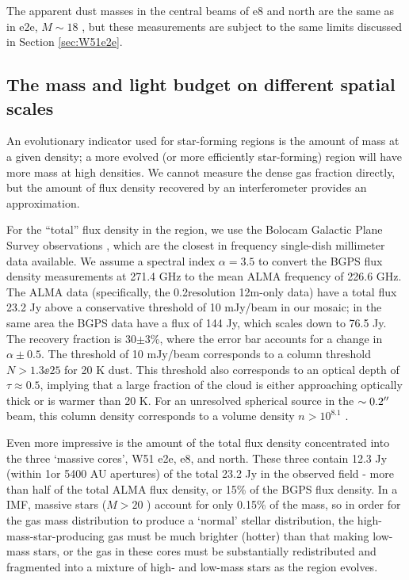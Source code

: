 \documentclass{aa}
\begin{document}
The apparent dust masses in the central beams of e8 and north are the same
as in e2e, $M\sim18$ \msun, but these measurements are subject to the same
limits discussed in Section \ref{sec:W51e2e}.

\subsection{The mass and light budget on different spatial scales}
\label{sec:massbudget}
An evolutionary indicator used for star-forming regions is the amount of mass
at a given density; a more evolved (or more efficiently star-forming) region will
have more mass at high densities.  We cannot measure the dense gas fraction
directly, but the amount of flux density recovered by an interferometer
provides an approximation.

For the ``total'' flux density in the region, we use the Bolocam Galactic Plane
Survey observations \citep{Aguirre2011a,Ginsburg2013a}, which are the closest
in frequency single-dish millimeter data available.  We assume a spectral index
$\alpha=3.5$ to convert the BGPS flux density measurements at 271.4 GHz to the
mean ALMA frequency of 226.6 GHz.  The ALMA data (specifically, the
0.2\arcsec resolution 12m-only data) have a total flux 23.2 Jy above a  conservative
threshold of 10 mJy/beam in our
mosaic; in the same area the BGPS data have a flux of 144 Jy, which scales down to
76.5 Jy.  The recovery fraction is 30$\pm3$\%, where the error bar accounts
for a change in $\alpha\pm0.5$.  The threshold of 10 mJy/beam corresponds to a
column threshold $N>1.3\ee{25}$ \percc for 20 K dust. This threshold also
corresponds to an optical depth of $\tau\approx0.5$, implying that a large
fraction of the cloud is either approaching optically thick or is warmer than 20
K.  For an unresolved spherical source in the $\sim0.2\mbox{$^{\prime\prime}$}$ beam, this
column density corresponds to a volume density $n>10^{8.1}$ \percc.


Even more impressive is the amount of the total flux density concentrated
into the three `massive cores', W51 e2e, e8, and north.  These three contain
12.3 Jy (within 1\arcsec or 5400 AU apertures) of the total 23.2 Jy in the
observed field - more than half of the total ALMA flux density, or 15\% of the
BGPS flux density.  In a \citet{Kroupa2001a} IMF, massive stars ($M>20$ \msun)
account for only 0.15\% of the mass, so in order for the gas mass distribution
to produce a `normal' stellar distribution, the high-mass-star-producing gas
must be much brighter (hotter) than that making low-mass stars, or the gas 
in these cores must be substantially redistributed and fragmented into a
mixture of high- and low-mass stars as the region evolves.
\end{document}
